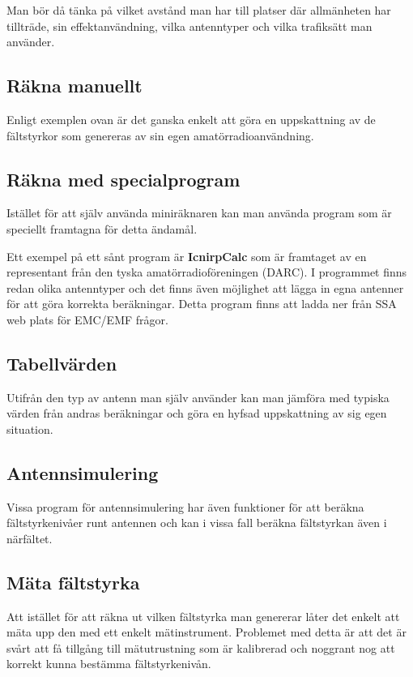 Man bör då tänka på vilket avstånd man har till platser där allmänheten 
har tillträde, sin effektanvändning, vilka antenntyper och vilka
trafiksätt man använder.

\subsection{Räkna manuellt}

Enligt exemplen ovan är det ganska enkelt att göra en uppskattning av
de fältstyrkor som genereras av sin egen amatörradioanvändning.

\subsection{Räkna med specialprogram}

Istället för att själv använda miniräknaren kan man använda program
som är speciellt framtagna för detta ändamål.

Ett exempel på ett sånt program är \textbf{IcnirpCalc} som är framtaget av en
representant från den tyska amatörradioföreningen (DARC). I programmet
finns redan olika antenntyper och det finns även möjlighet att lägga
in egna antenner för att göra korrekta beräkningar.
Detta program finns att ladda ner från SSA web plats för EMC/EMF frågor.

\subsection{Tabellvärden}

Utifrån den typ av antenn man själv använder kan man jämföra med
typiska värden från andras beräkningar och göra en hyfsad uppskattning
av sig egen situation.

\subsection{Antennsimulering}

Vissa program för antennsimulering har även funktioner för att beräkna
fältstyrkenivåer runt antennen och kan i vissa fall beräkna fältstyrkan
även i närfältet.

\subsection{Mäta fältstyrka}

Att istället för att räkna ut vilken fältstyrka man genererar låter
det enkelt att mäta upp den med ett enkelt mätinstrument. Problemet
med detta är att det är svårt att få tillgång till mätutrustning som är
kalibrerad och noggrant nog att korrekt kunna bestämma fältstyrkenivån.


